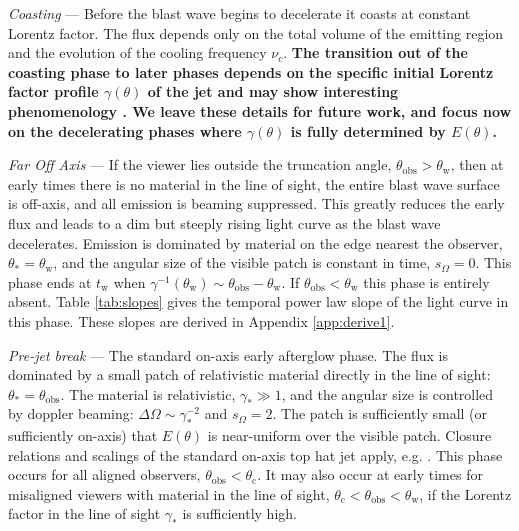 \documentclass[twocolumn]{aastex62}
\newcommand{\tW}{\ensuremath{t_{\mathrm{w}}}}
\newcommand{\thobs}{\ensuremath{\theta_{\mathrm{obs}}}}
\newcommand{\thW}{\ensuremath{\theta_{\mathrm{w}}}}
\newcommand{\thC}{\ensuremath{\theta_{\mathrm{c}}}}
\newcommand{\som}{\ensuremath{s_{\Omega}}}
\begin{document}
\emph{Coasting} --- Before the blast wave begins to decelerate it coasts at constant Lorentz factor. The flux depends only on the total volume of the emitting region and the evolution of the cooling frequency $\nu_c$.  {\bf The transition out of the coasting phase to later phases depends on the specific initial Lorentz factor profile $\gamma(\theta)$ of the jet and may show interesting phenomenology \citep{Beniamini:2020ab}.  We leave these details for future work, and focus now on the decelerating phases where $\gamma(\theta)$ is fully determined by $E(\theta)$.}

\emph{Far Off Axis} --- If the viewer lies outside the truncation angle, $\thobs > \thW$, then at early times there is no material in the line of sight, the entire blast wave surface is off-axis, and all emission is beaming suppressed.  This greatly reduces the early flux and leads to a dim but steeply rising light curve as the blast wave decelerates.  Emission is dominated by material on the edge nearest the observer, $\theta_* = \thW$, and the angular size of the visible patch is constant in time, $\som = 0$.  This phase ends at $\tW$ when $\gamma^{-1}(\thW) \sim \thobs-\thW$.  If $\thobs < \thW$ this phase is entirely absent.  Table \ref{tab:slopes} gives the temporal power law slope of the light curve in this phase.  These slopes are derived in Appendix \ref{app:derive1}.

\emph{Pre-jet break} --- The standard on-axis early afterglow phase.  The flux is dominated by a small patch of relativistic material directly in the line of sight: $\theta_* = \thobs$.  The material is relativistic, $\gamma_* \gg 1$, and the angular size is controlled by doppler beaming: $\Delta \Omega \sim \gamma_*^{-2}$ and $\som = 2$.  The patch is sufficiently small (or sufficiently on-axis) that $E(\theta)$ is near-uniform over the visible patch.  Closure relations and scalings of the standard on-axis top hat jet apply, e.g. \citet{Granot:2002aa}.  This phase occurs for all aligned observers, $\thobs < \thC$.  It may also occur at early times for misaligned viewers with material in the line of sight, $\thC < \thobs < \thW$, if the Lorentz factor in the line of sight $\gamma_*$ is sufficiently high.
\end{document}
